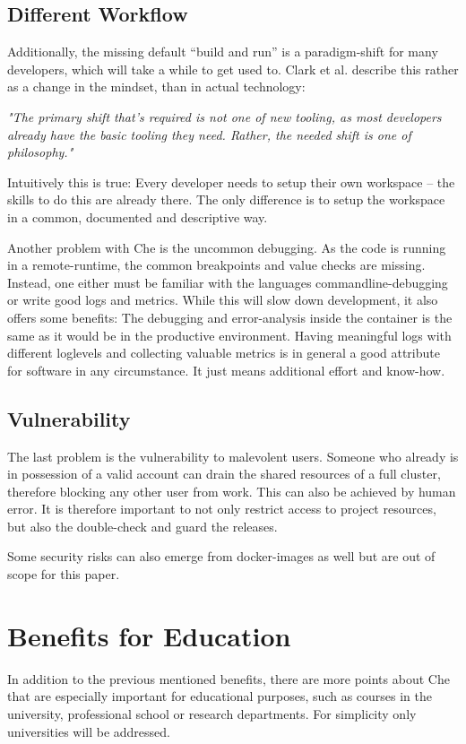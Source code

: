 \documentclass[english,utf8]{lni}
\begin{document}
\subsection{Different Workflow}
Additionally, the missing default “build and run” is a paradigm-shift for many developers, which will take a while to get used to. 
Clark et al. \cite{CL14} describe this rather as a change in the mindset, than in actual technology: 

\begin{centering}
	\textit{"The primary shift that’s required is not one of new tooling, as most developers already have the basic tooling they need.\newline 
	Rather, the needed shift is one of philosophy."}
\end{centering}

Intuitively this is true: Every developer needs to setup their own workspace – the skills to do this are already there. 
The only difference is to setup the workspace in a common, documented and descriptive way. 

Another problem with Che is the uncommon debugging. 
As the code is running in a remote-runtime, the common breakpoints  and  value checks are missing.  
Instead,  one  either must be familiar with the languages commandline-debugging or write good logs and metrics. 
While this will slow down development, it also offers some benefits: 
The debugging and error-analysis inside the container is the same as it would be in the productive environment. 
Having meaningful logs with different loglevels and collecting valuable metrics is in general a good attribute for software in any circumstance. 
It just means additional effort and know-how.  

\subsection{Vulnerability}
The last problem is the vulnerability to malevolent users. 
Someone who already is in possession of a valid account can drain the shared resources of a full cluster, therefore blocking  any  other  user  from  work.
This  can  also  be achieved by human error. 
It is therefore important to not only restrict access to project resources, but also the double-check and guard the releases.
  
Some security risks can also emerge from docker-images as well \cite{PE13} but are out of scope for this paper.

\section{Benefits for Education}
\label{sec:EvalEdu}
In addition to the previous mentioned benefits, there are more points about Che that are especially important for educational purposes, such as courses in the university, professional school or research departments.
For simplicity only universities will be addressed.
\end{document}
